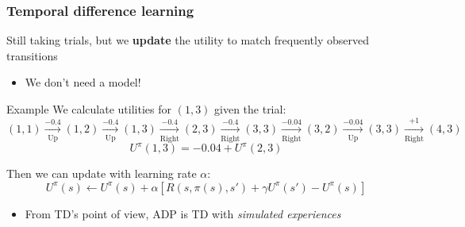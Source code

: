 \documentclass{beamer}
\begin{document}
\begin{frame}
	\frametitle{Temporal difference learning}
	Still taking trials, but we \textbf{update} the utility to match frequently observed transitions
	\begin{itemize}
		\item We don't need a model!
	\end{itemize}
	\pause
	\begin{block}{Example}
	We calculate utilities for $(1,3)$ given the trial:
		$$
		\scriptstyle
		(1,1) \xrightarrow[\text{Up}]{-0.4} 
		(1,2) \xrightarrow[\text{Up}]{-0.4}
		(1,3) \xrightarrow[\text{Right}]{-0.4}
		(2,3) \xrightarrow[\text{Right}]{-0.4}
		(3,3) \xrightarrow[\text{Right}]{-0.04}
		(3,2) \xrightarrow[\text{Up}]{-0.04}
		(3,3) \xrightarrow[\text{Right}]{+1}
		(4,3)	
	$$
	\pause
	$$
		U^\pi (1, 3) = -0.04 + U^\pi (2,3)
	$$
	\end{block}
	\pause
	Then we can update with learning rate $\alpha$:
	$$
	U^\pi(s) \leftarrow U^\pi(s) + \alpha \left[ R(s, \pi(s), s') + \gamma U^\pi (s') - U^\pi (s) \right]
	$$
	\begin{itemize}
		\item From TD's point of view, ADP is TD with \textit{simulated experiences}
	\end{itemize}
\end{frame}
\end{document}
